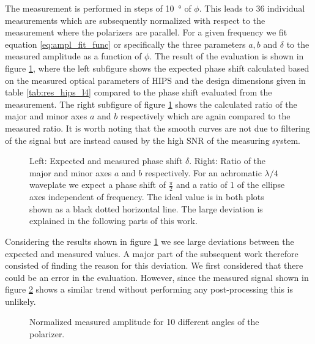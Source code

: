 The measurement is performed in steps of \SI{10}{\degree} of $\phi$. This leads to 36 individual measurements which are subsequently normalized with respect to the measurement where the polarizers are parallel. For a given frequency we fit equation \ref{eq:ampl_fit_func} or specifically the three parameters $a,b$ and $\delta$ to the measured amplitude as a function of $\phi$. The result of the evaluation is shown in figure \ref{fig:meas_result}, where the left subfigure shows the expected phase shift calculated based on the measured optical parameters of HIPS and the design dimensions given in table \ref{tab:res_hips_l4} compared to the phase shift evaluated from the measurement. The right subfigure of figure \ref{fig:meas_result} shows the calculated ratio of the major and minor axes $a$ and $b$ respectively which are again compared to the measured ratio. It is worth noting that the smooth curves are not due to filtering of the signal but are instead caused by the high SNR of the measuring system.

\begin{figure}[H]
    \centering
    
    \caption{Left: Expected and measured phase shift $\delta$. Right: Ratio of the major and minor axes $a$ and $b$ respectively. For an achromatic $\lambda/4$ waveplate we expect a phase shift of $\frac{\pi}{2}$ and a ratio of 1 of the ellipse axes independent of frequency. The ideal value is in both plots shown as a black dotted horizontal line. The large deviation is explained in the following parts of this work.}
    \label{fig:meas_result}
\end{figure}

Considering the results shown in figure \ref{fig:meas_result} we see large deviations between the expected and measured values. A major part of the subsequent work therefore consisted of finding the reason for this deviation. We first considered that there could be an error in the evaluation. However, since the measured signal shown in figure \ref{fig:measured_amplitude} shows a similar trend without performing any post-processing this is unlikely.

\begin{figure}[H]
    \centering
    
    \caption{Normalized measured amplitude for 10 different angles of the polarizer.}
    \label{fig:measured_amplitude}
\end{figure}

